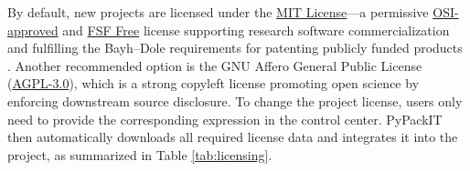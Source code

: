 \documentclass{article}
\begin{document}
By default, new projects are licensed under the \href{https://spdx.org/licenses/MIT.html}{MIT License}—a permissive \href{https://opensource.org/licenses}{OSI-approved} and \href{https://www.gnu.org/licenses/license-list.en.html}{FSF Free} license supporting research software commercialization \cite{SettingUpShop} and fulfilling the Bayh–Dole requirements for patenting publicly funded products \cite{BayhDole}. Another recommended option is the GNU Affero General Public License (\href{https://www.gnu.org/licenses/agpl-3.0.en.html}{AGPL-3.0}), which is a strong copyleft license promoting open science by enforcing downstream source disclosure. To change the project license, users only need to provide the corresponding expression in the control center. PyPackIT then automatically downloads all required license data and integrates it into the project, as summarized in Table \ref{tab:licensing}.
\end{document}
